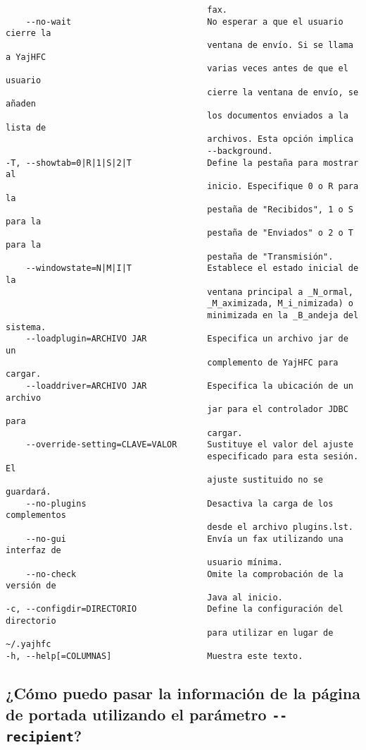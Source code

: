\documentclass[a4paper,10pt]{scrartcl}
\begin{document}
\begin{verbatim}
                                        fax.
    --no-wait                           No esperar a que el usuario cierre la
                                        ventana de envío. Si se llama a YajHFC
                                        varias veces antes de que el usuario
                                        cierre la ventana de envío, se añaden
                                        los documentos enviados a la lista de
                                        archivos. Esta opción implica
                                        --background.
-T, --showtab=0|R|1|S|2|T               Define la pestaña para mostrar al
                                        inicio. Especifique 0 o R para la
                                        pestaña de "Recibidos", 1 o S para la
                                        pestaña de "Enviados" o 2 o T para la
                                        pestaña de "Transmisión".
    --windowstate=N|M|I|T               Establece el estado inicial de la
                                        ventana principal a _N_ormal,
                                        _M_aximizada, M_i_nimizada) o
                                        minimizada en la _B_andeja del sistema.
    --loadplugin=ARCHIVO JAR            Especifica un archivo jar de un
                                        complemento de YajHFC para cargar.
    --loaddriver=ARCHIVO JAR            Especifica la ubicación de un archivo
                                        jar para el controlador JDBC para
                                        cargar.
    --override-setting=CLAVE=VALOR      Sustituye el valor del ajuste
                                        especificado para esta sesión. El
                                        ajuste sustituido no se guardará.
    --no-plugins                        Desactiva la carga de los complementos
                                        desde el archivo plugins.lst.
    --no-gui                            Envía un fax utilizando una interfaz de
                                        usuario mínima.
    --no-check                          Omite la comprobación de la versión de
                                        Java al inicio.
-c, --configdir=DIRECTORIO              Define la configuración del directorio
                                        para utilizar en lugar de ~/.yajhfc
-h, --help[=COLUMNAS]                   Muestra este texto.
\end{verbatim}

\subsection{¿Cómo puedo pasar la información de la página de portada utilizando el parámetro \texttt{-{-}recipient}?}
\end{document}
